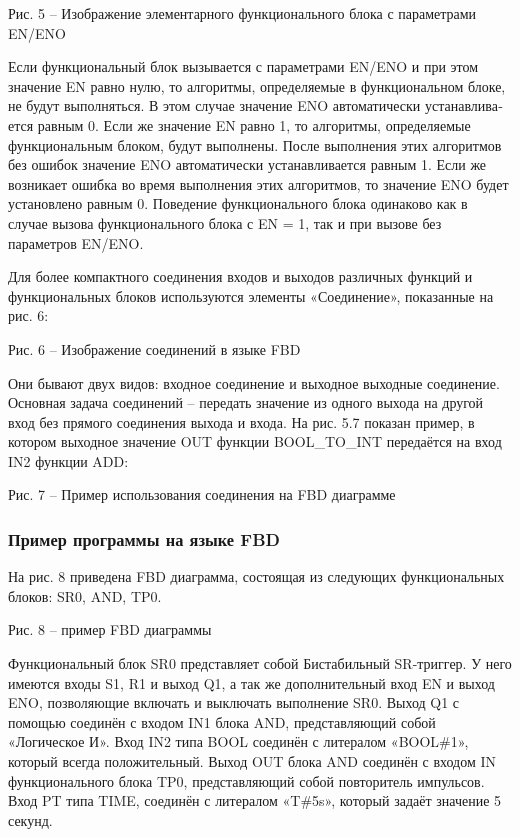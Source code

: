 \documentclass[letterpaper,10pt,russian]{sphinxmanual}
\begin{document}

Рис. 5 – Изображение элементарного функционального блока с параметрами
EN/ENO

Если функциональный блок вызывается с параметрами EN/ENO и при этом
значе­ние EN равно нулю, то алгоритмы, определяемые в функциональном
блоке, не будут вы­полняться. В этом случае значение ENO автоматически
устанавлива­ется равным 0. Если же значение EN равно 1, то алгоритмы,
опреде­ляемые функциональным блоком, будут выполнены. После выполнения
этих алгоритмов без ошибок значение ENO автоматически устанавливается
равным 1. Если же возникает ошибка во время выполнения этих алгоритмов,
то значение ENO будет установлено равным 0. Поведение функционального
блока одинаково как в случае вызова функционального блока с EN = 1, так
и при вызове без параметров EN/ENO.

Для более компактного соединения входов и выходов различных функций и
функциональных блоков используются элементы «Соединение», показанные на
рис. 6:


Рис. 6 – Изображение соединений в языке FBD

Они бывают двух видов: входное соединение и выходное выходные
соединение. Основная задача соединений – передать значение из одного
выхода на другой вход без прямого соединения выхода и входа. На рис. 5.7
показан пример, в котором выходное значение OUT функции BOOL\_TO\_INT
передаётся на вход IN2 функции ADD:


Рис. 7 – Пример использования соединения на FBD диаграмме


\subsubsection{Пример программы на языке FBD}
\label{iec_guide/fbd_guide:id3}
На рис. 8 приведена FBD диаграмма, состоящая из следующих
функциональных блоков: SR0, AND, TP0.


Рис. 8 – пример FBD диаграммы

Функциональный блок SR0 представляет собой Бистабильный SR-триггер. У
него имеются входы S1, R1 и выход Q1, а так же дополнительный вход EN и
выход ENO, позволяющие включать и выключать выполнение SR0. Выход Q1 с
помощью соединён с входом IN1 блока AND, представляющий собой
«Логическое И». Вход IN2 типа BOOL соединён с литералом «BOOL\#1»,
который всегда положительный. Выход OUT блока AND соединён с входом IN
функционального блока TP0, представляющий собой повторитель импульсов.
Вход PT типа TIME, соединён с литералом «T\#5s», который задаёт значение
5 секунд.
\end{document}
